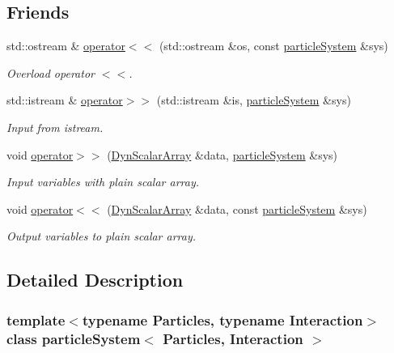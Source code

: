 \subsection*{Friends}
\begin{DoxyCompactItemize}
\item 
std\+::ostream \& \mbox{\hyperlink{classparticle_system_a58e2c35978a7eb211e7206a05855b331}{operator$<$$<$}} (std\+::ostream \&os, const \mbox{\hyperlink{classparticle_system}{particle\+System}} \&sys)
\begin{DoxyCompactList}\small\item\em Overload operator $<$$<$. \end{DoxyCompactList}\item 
std\+::istream \& \mbox{\hyperlink{classparticle_system_a7c8a355dd7f5c30b6f54c341bf672d10}{operator$>$$>$}} (std\+::istream \&is, \mbox{\hyperlink{classparticle_system}{particle\+System}} \&sys)
\begin{DoxyCompactList}\small\item\em Input from istream. \end{DoxyCompactList}\item 
void \mbox{\hyperlink{classparticle_system_a53c94eb1bfef0dfea4ab31fcd64f72a6}{operator$>$$>$}} (\mbox{\hyperlink{classparticle_system_a768fe562ed8dcc0973f3d422708835bf}{Dyn\+Scalar\+Array}} \&data, \mbox{\hyperlink{classparticle_system}{particle\+System}} \&sys)
\begin{DoxyCompactList}\small\item\em Input variables with plain scalar array. \end{DoxyCompactList}\item 
void \mbox{\hyperlink{classparticle_system_ab8d056a726e4fe132f019ba998d6e386}{operator$<$$<$}} (\mbox{\hyperlink{classparticle_system_a768fe562ed8dcc0973f3d422708835bf}{Dyn\+Scalar\+Array}} \&data, const \mbox{\hyperlink{classparticle_system}{particle\+System}} \&sys)
\begin{DoxyCompactList}\small\item\em Output variables to plain scalar array. \end{DoxyCompactList}\end{DoxyCompactItemize}


\subsection{Detailed Description}
\subsubsection*{template$<$typename Particles, typename Interaction$>$\newline
class particle\+System$<$ Particles, Interaction $>$}

